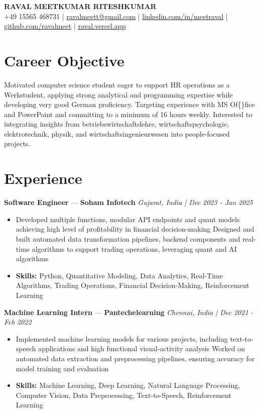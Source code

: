 \documentclass[a4paper,10pt]{article}
\begin{document}
\begin{center}
  {\Large\bfseries RAVAL MEETKUMAR RITESHKUMAR}\\[2pt]
  {\small +49 15565 468731 \;|\; \href{mailto:ravalmeett@gmail.com}{ravalmeett@gmail.com} \;|\; \href{https://www.linkedin.com/in/meetraval/}{linkedin.com/in/meetraval} \;|\; \href{https://github.com/ravalmeet}{github.com/ravalmeet} \;|\; \href{https://raval.vercel.app/}{raval.vercel.app}}
\end{center}
\vspace{-3pt}

\section*{Career Objective}
Motivated computer science student eager to support HR operations as a Werkstudent, applying strong analytical and programming expertise while developing very good German proficiency. Targeting experience with MS Of\{\}fice and PowerPoint and committing to a minimum of 16 hours weekly. Interested to integrating insights from betriebswirtschaftslehre, wirtschaftspsychologie, elektrotechnik, physik, and wirtschaftsingenieurwesen into people-focused projects.\par

\section*{Experience}
\textbf{Software Engineer} — \textbf{Soham Infotech} \hfill \textit{Gujarat, India \;|\; Dec 2023 - Jan 2025}\par
\vspace{1pt}
\begin{itemize}
  \item Developed multiple functions, modular API endpoints and quant models achieving high level of profitability in financial decision-making Designed and built automated data transformation pipelines, backend components and real-time algorithms to support trading operations, leveraging quant and AI algorithms
  \item \textbf{Skills:} Python, Quantitative Modeling, Data Analytics, Real-Time Algorithms, Trading Operations, Financial Decision-Making, Reinforcement Learning
\end{itemize}
\vspace{3pt}
\textbf{Machine Learning Intern} — \textbf{Pantechelearning} \hfill \textit{Chennai, India \;|\; Dec 2021 - Feb 2022}\par
\vspace{1pt}
\begin{itemize}
  \item Implemented machine learning models for various projects, including text-to-speech applications and high functional visual-activity analysis Worked on automated data extraction and preprocessing pipelines, ensuring accuracy for model training and evaluation
  \item \textbf{Skills:} Machine Learning, Deep Learning, Natural Language Processing, Computer Vision, Data Preprocessing, Text-to-Speech, Reinforcement Learning
\end{itemize}
\end{document}
